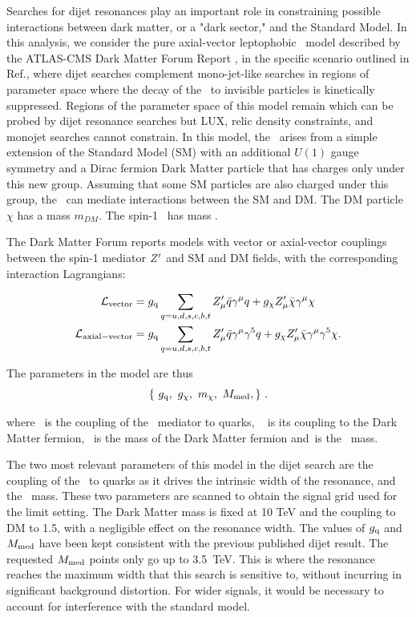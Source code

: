 Searches for dijet resonances play an important role in constraining
possible interactions between dark matter, or a "dark sector," and the
Standard Model. In this analysis, we consider the pure axial-vector
leptophobic \Zprime\ model described by the ATLAS-CMS Dark Matter Forum
Report \cite{Abercrombie:2015wmb}, in the specific scenario outlined in Ref.\cite{Chala:2015ama}, 
where dijet searches complement mono-jet-like searches in regions of
parameter space where the decay of the \Zprime\ to invisible particles is
kinetically suppressed. Regions of the parameter space of this model
remain which can be probed by dijet resonance searches but LUX, relic
density constraints, and monojet searches cannot constrain.
% 
In this model, the \Zprime\ arises from a simple extension of the Standard
Model (SM) with an additional $U(1)$ gauge symmetry and a Dirac
fermion Dark Matter particle that has charges only under this new
group. Assuming that some SM particles are also charged under this
group, the \Zprime\ can mediate interactions between the SM and DM. The DM
particle $\chi$ has a mass $m_{DM}$. The spin-1 \Zprime\ has mass \mMed.

The Dark Matter Forum reports models with vector or axial-vector couplings
between the spin-1 mediator $Z^\prime$ and SM and DM fields, with the corresponding interaction Lagrangians:

\begin{align}
	\label{eq:AV}
	\mathcal{L}_{\mathrm{vector}} &= g_{\mathrm q} \sum_{q={u,d,s,c,b,t}}  Z^\prime_{\mu} \bar{q}\gamma^{\mu}q + g_{\chi} Z^\prime_{\mu} \bar{\chi}\gamma^{\mu}\chi \\
	\mathcal{L}_{\mathrm{axial-vector}} &= g_{\mathrm q} \sum_{q={u,d,s,c,b,t}}  Z^\prime_{\mu} \bar{q}\gamma^{\mu}\gamma^5q + g_{\chi} Z^\prime_{\mu} \bar{\chi}\gamma^{\mu}\gamma^5\chi.
\end{align}

The parameters in the model are thus
\begin{equation}
\left\{~g_{\mathrm q}, 
~ g_{\chi}, 
~m_{\chi},
~M_{\mathrm{med}},
\right\} \,.
\end{equation}

where ~\gq is the coupling of the \Zprime\ mediator to quarks, ~ \gDM
is its coupling to the Dark Matter fermion, ~\mDM is the mass
of the Dark Matter fermion and~\mMed is the \Zprime\ mass. 

The two most relevant parameters of this model in the dijet search are the coupling of the \Zprime\ to quarks
as it drives the intrinsic width of the resonance, and the \Zprime\ mass. 
These two parameters are scanned to obtain the signal grid used
for the limit setting. The Dark Matter mass is fixed at 10 TeV and the coupling to DM to 1.5, with 
a negligible effect on the resonance width. 
% 
The values of $g_{\mathrm q}$ and $M_{\mathrm{med}}$ have been kept consistent with the previous published dijet result.
The requested $M_{\mathrm{med}}$ points only go up to 3.5~TeV. This is where the resonance reaches the maximum width
that this search is sensitive to, without incurring in significant background distortion. 
For wider signals, it would be necessary to account for interference with the standard model.

